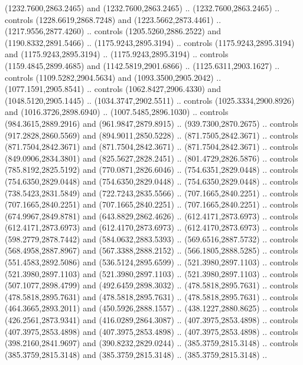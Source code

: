 \begin{scope}[shift={(296.85925,-6.26562)}]
\begin{scope}[shift={(-138.30846,-2572.6617)}]
\begin{scope}
        (1232.7600,2863.2465) and (1232.7600,2863.2465) .. (1232.7600,2863.2465) ..
        controls (1228.6619,2868.7248) and (1223.5662,2873.4461) ..
        (1217.9556,2877.4260) .. controls (1205.5260,2886.2522) and
        (1190.8332,2891.5466) .. (1175.9243,2895.3194) .. controls
        (1175.9243,2895.3194) and (1175.9243,2895.3194) .. (1175.9243,2895.3194) ..
        controls (1159.4845,2899.4685) and (1142.5819,2901.6866) ..
        (1125.6311,2903.1627) .. controls (1109.5282,2904.5634) and
        (1093.3500,2905.2042) .. (1077.1591,2905.8541) .. controls
        (1062.8427,2906.4330) and (1048.5120,2905.1445) .. (1034.3747,2902.5511) ..
        controls (1025.3334,2900.8926) and (1016.3726,2898.6940) ..
        (1007.5485,2896.1030) .. controls (984.3615,2889.2916) and
        (961.9847,2879.8915) .. (939.7300,2870.2675) .. controls (917.2828,2860.5569)
        and (894.9011,2850.5228) .. (871.7505,2842.3671) .. controls
        (871.7504,2842.3671) and (871.7504,2842.3671) .. (871.7504,2842.3671) ..
        controls (849.0906,2834.3801) and (825.5627,2828.2451) .. (801.4729,2826.5876)
        .. controls (785.8192,2825.5192) and (770.0871,2826.6046) ..
        (754.6351,2829.0448) .. controls (754.6350,2829.0448) and (754.6350,2829.0448)
        .. (754.6350,2829.0448) .. controls (738.5423,2831.5849) and
        (722.7243,2835.5566) .. (707.1665,2840.2251) .. controls (707.1665,2840.2251)
        and (707.1665,2840.2251) .. (707.1665,2840.2251) .. controls
        (674.9967,2849.8781) and (643.8829,2862.4626) .. (612.4171,2873.6973) ..
        controls (612.4171,2873.6973) and (612.4170,2873.6973) .. (612.4170,2873.6973)
        .. controls (598.2779,2878.7442) and (584.0632,2883.5393) ..
        (569.6516,2887.5732) .. controls (568.4958,2887.8967) and (567.3388,2888.2152)
        .. (566.1805,2888.5285) .. controls (551.4583,2892.5086) and
        (536.5124,2895.6599) .. (521.3980,2897.1103) .. controls (521.3980,2897.1103)
        and (521.3980,2897.1103) .. (521.3980,2897.1103) .. controls
        (507.1077,2898.4799) and (492.6459,2898.3032) .. (478.5818,2895.7631) ..
        controls (478.5818,2895.7631) and (478.5818,2895.7631) .. (478.5818,2895.7631)
        .. controls (464.3665,2893.2011) and (450.5926,2888.1557) ..
        (438.1227,2880.8625) .. controls (426.2561,2873.9341) and (416.0289,2864.3087)
        .. (407.3975,2853.4898) .. controls (407.3975,2853.4898) and
        (407.3975,2853.4898) .. (407.3975,2853.4898) .. controls (398.2160,2841.9697)
        and (390.8232,2829.0244) .. (385.3759,2815.3148) .. controls
        (385.3759,2815.3148) and (385.3759,2815.3148) .. (385.3759,2815.3148) ..

\end{scope}
\end{scope}
\end{scope}
